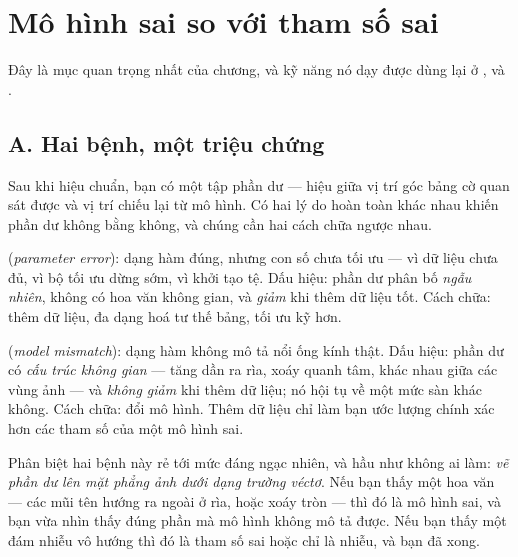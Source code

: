 \documentclass[../../vslam.tex]{subfiles}
\begin{document}
\section{Mô hình sai so với tham số sai}

Đây là mục quan trọng nhất của chương, và kỹ năng nó dạy được dùng lại ở ,  và .

\subsection{A. Hai bệnh, một triệu chứng}

Sau khi hiệu chuẩn, bạn có một tập phần dư --- hiệu giữa vị trí góc bảng cờ quan sát được và vị trí chiếu lại từ mô hình. Có hai lý do hoàn toàn khác nhau khiến phần dư không bằng không, và chúng cần hai cách chữa ngược nhau.

 (\emph{parameter error}): dạng hàm đúng, nhưng con số chưa tối ưu --- vì dữ liệu chưa đủ, vì bộ tối ưu dừng sớm, vì khởi tạo tệ. Dấu hiệu: phần dư phân bố \emph{ngẫu nhiên}, không có hoa văn không gian, và \emph{giảm} khi thêm dữ liệu tốt. Cách chữa: thêm dữ liệu, đa dạng hoá tư thế bảng, tối ưu kỹ hơn.

 (\emph{model mismatch}): dạng hàm không mô tả nổi ống kính thật. Dấu hiệu: phần dư có \emph{cấu trúc không gian} --- tăng dần ra rìa, xoáy quanh tâm, khác nhau giữa các vùng ảnh --- và \emph{không giảm} khi thêm dữ liệu; nó hội tụ về một mức sàn khác không. Cách chữa: đổi mô hình. Thêm dữ liệu chỉ làm bạn ước lượng chính xác hơn các tham số của một mô hình sai.

Phân biệt hai bệnh này rẻ tới mức đáng ngạc nhiên, và hầu như không ai làm: \emph{vẽ phần dư lên mặt phẳng ảnh dưới dạng trường véctơ}. Nếu bạn thấy một hoa văn --- các mũi tên hướng ra ngoài ở rìa, hoặc xoáy tròn --- thì đó là mô hình sai, và bạn vừa nhìn thấy đúng phần mà mô hình không mô tả được. Nếu bạn thấy một đám nhiễu vô hướng thì đó là tham số sai hoặc chỉ là nhiễu, và bạn đã xong.
\end{document}
